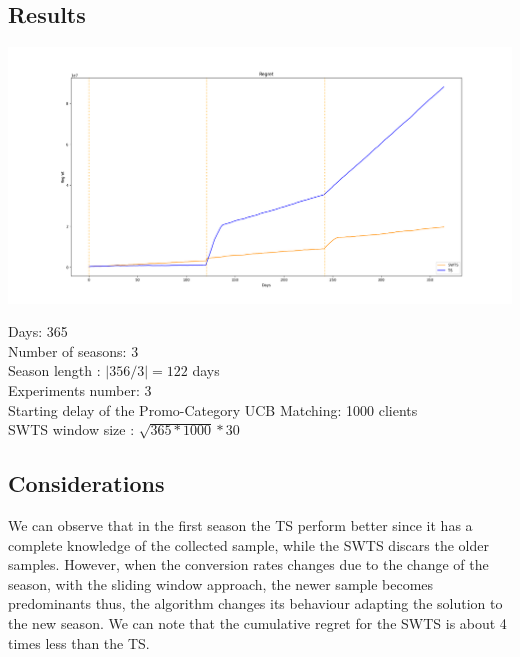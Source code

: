 \subsection*{Results}
\begin{center}
	\includegraphics[scale=0.30]{Images/n7}
\end{center}
Days: 365\\
Number of seasons: 3 \\
Season length : $|356/3| = 122 $ days\\
Experiments number: 3 \\
Starting delay of the Promo-Category UCB Matching: 1000 clients\\
SWTS window size : $\sqrt{365 * 1000} * 30$\\
\subsection*{Considerations}
We can observe that in the first season the TS perform better since it has a complete knowledge of the collected sample, while the SWTS discars the older samples. However, when the conversion rates changes due to the change of the season, with the sliding window approach, the newer sample becomes predominants thus, the algorithm changes its behaviour adapting the solution to the new season. We can note that the cumulative regret for the SWTS is about 4 times less than the TS. 